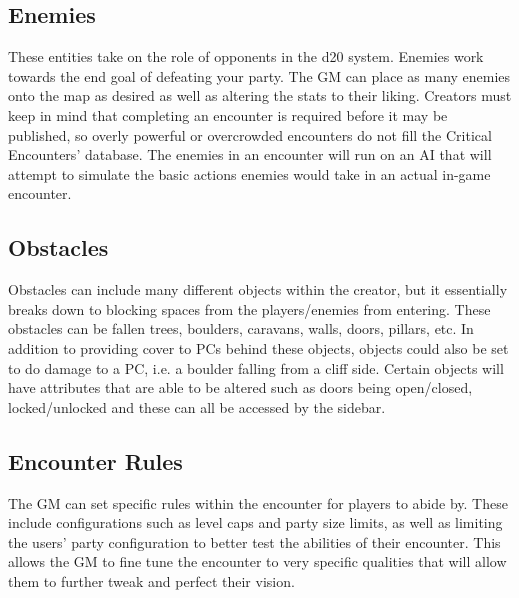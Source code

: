 \documentclass[12pt,a4paper]{report}
\begin{document}
		\subsection{Enemies}
		These entities take on the role of opponents in the d20 system. Enemies work towards the end goal of defeating your party. The GM can place as many enemies onto the map as desired as well as altering the stats to their liking. Creators must keep in mind that completing an encounter is required before it may be published, so overly powerful or overcrowded encounters do not fill the Critical Encounters' database. The enemies in an encounter will run on an AI that will attempt to simulate the basic actions enemies would take in an actual in-game encounter.
		\subsection{Obstacles}
		Obstacles can include many different objects within the creator, but it essentially breaks down to blocking spaces from the players/enemies from entering. These obstacles can be fallen trees, boulders, caravans, walls, doors, pillars, etc. In addition to providing cover to PCs behind these objects, objects could also be set to do damage to a PC, i.e. a boulder falling from a cliff side. Certain objects will have attributes that are able to be altered such as doors being open/closed, locked/unlocked and these can all be accessed by the sidebar.
		\subsection{Encounter Rules}
		The GM can set specific rules within the encounter for players to abide by. These include configurations such as level caps and party size limits, as well as limiting the users' party configuration to better test the abilities of their encounter. This allows the GM to fine tune the encounter to very specific qualities that will allow them to further tweak and perfect their vision.
	\newpage
\end{document}
